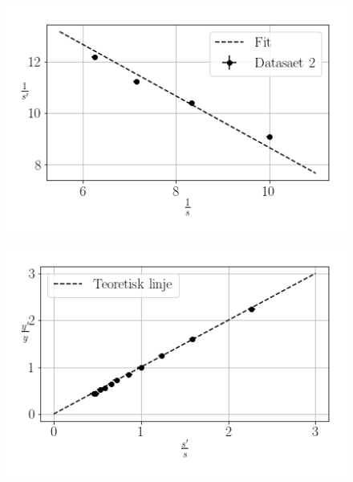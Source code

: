 \begin{figure}[H]
    \includegraphics[width=\linewidth]{2.png}
    \caption{}
    \label{fig:2}
\end{figure}

\begin{figure}[H]
    \includegraphics[width=\linewidth]{3.png}
    \caption{}
    \label{fig:3}
\end{figure}
